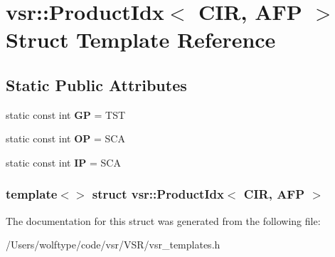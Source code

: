 \hypertarget{structvsr_1_1_product_idx_3_01_c_i_r_00_01_a_f_p_01_4}{\section{vsr\-:\-:Product\-Idx$<$ C\-I\-R, A\-F\-P $>$ Struct Template Reference}
\label{structvsr_1_1_product_idx_3_01_c_i_r_00_01_a_f_p_01_4}
}
\subsection*{Static Public Attributes}
\begin{DoxyCompactItemize}
\item 
\hypertarget{structvsr_1_1_product_idx_3_01_c_i_r_00_01_a_f_p_01_4_ab4fbdcf3a96fb0812db954998bd68eaa}{static const int {\bfseries G\-P} = T\-S\-T}\label{structvsr_1_1_product_idx_3_01_c_i_r_00_01_a_f_p_01_4_ab4fbdcf3a96fb0812db954998bd68eaa}

\item 
\hypertarget{structvsr_1_1_product_idx_3_01_c_i_r_00_01_a_f_p_01_4_ab178a9ce92d7ec1fa3b10e5e36bb3b83}{static const int {\bfseries O\-P} = S\-C\-A}\label{structvsr_1_1_product_idx_3_01_c_i_r_00_01_a_f_p_01_4_ab178a9ce92d7ec1fa3b10e5e36bb3b83}

\item 
\hypertarget{structvsr_1_1_product_idx_3_01_c_i_r_00_01_a_f_p_01_4_ab2a2f1b6443527813d2b78588b5a3a5b}{static const int {\bfseries I\-P} = S\-C\-A}\label{structvsr_1_1_product_idx_3_01_c_i_r_00_01_a_f_p_01_4_ab2a2f1b6443527813d2b78588b5a3a5b}

\end{DoxyCompactItemize}
\subsubsection*{template$<$$>$ struct vsr\-::\-Product\-Idx$<$ C\-I\-R, A\-F\-P $>$}



The documentation for this struct was generated from the following file\-:\begin{DoxyCompactItemize}
\item 
/\-Users/wolftype/code/vsr/\-V\-S\-R/vsr\-\_\-templates.\-h\end{DoxyCompactItemize}
